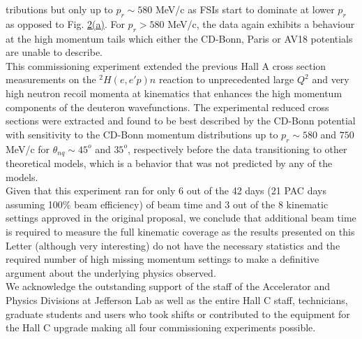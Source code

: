 \twocolumngrid
\noindent tributions but only up to $p_{r}\sim 580$ MeV/c as FSIs start to dominate at lower $p_{r}$ as opposed to Fig. \hyperref[fig:fig2]{2(a)}.
For $p_{r}>580$ MeV/c, the data again exhibits a behaviour at the high momentum tails which either the CD-Bonn, Paris or AV18 potentials are unable to describe.\\
\indent This commissioning experiment extended the previous Hall A cross section measurements on the $^{2}H(e,e'p)n$ reaction to 
unprecedented large $Q^{2}$ and very high neutron recoil momenta at kinematics that enhances the high momentum components of the deuteron wavefunctions.
The experimental reduced cross sections were extracted and found to be best described by the CD-Bonn potential with sensitivity to the CD-Bonn momentum distributions
up to $p_{r}\sim580$ and $750$ MeV/c for $\theta_{nq}\sim45^{o}$ and $35^{o}$, respectively before the data transitioning to other theoretical models, which is a
behavior that was not predicted by any of the models. \\
\indent Given that this experiment ran for only 6 out of the 42 days (21 PAC days assuming 100$\%$ beam efficiency) of beam time and 3 out of the 8 kinematic settings approved in
the original proposal\cite{e12_10_003_proposal}, we conclude that additional beam time is required to measure the full kinematic coverage as the results presented on this Letter
(although very interesting) do not have the necessary statistics and the required number of high missing momentum settings to make a definitive argument about the underlying physics observed. \\
\indent We acknowledge the outstanding support of the staff of the Accelerator and Physics Divisions at Jefferson Lab
as well as the entire Hall C staff, technicians, graduate students and users who took shifts or contributed
to the equipment for the Hall C upgrade making all four commissioning experiments possible. 


